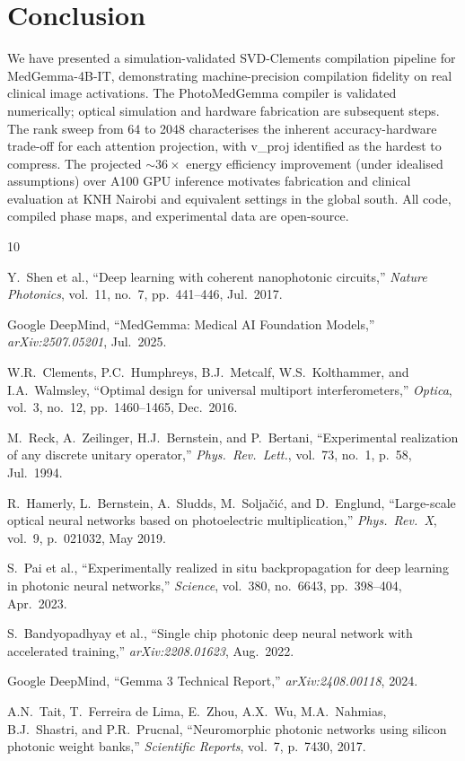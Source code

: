 \documentclass[journal]{IEEEtran}
\begin{document}
\section{Conclusion}
\label{sec:conclusion}

We have presented a simulation-validated SVD-Clements compilation pipeline
for MedGemma-4B-IT, demonstrating machine-precision compilation fidelity
on real clinical image activations.
The PhotoMedGemma compiler is validated numerically; optical simulation and
hardware fabrication are subsequent steps.
The rank sweep from 64 to 2048 characterises the inherent accuracy-hardware
trade-off for each attention projection, with v\_proj identified as the
hardest to compress.
The projected $\sim36\times$ energy efficiency improvement (under idealised
assumptions) over A100 GPU inference motivates fabrication and clinical
evaluation at KNH Nairobi and equivalent settings in the global south.
All code, compiled phase maps, and experimental data are open-source.


\begin{thebibliography}{10}

Y.\ Shen et al., ``Deep learning with coherent nanophotonic circuits,''
\textit{Nature Photonics}, vol.\ 11, no.\ 7, pp.\ 441--446, Jul.\ 2017.

Google DeepMind, ``MedGemma: Medical AI Foundation Models,''
\textit{arXiv:2507.05201}, Jul.\ 2025.

W.R.\ Clements, P.C.\ Humphreys, B.J.\ Metcalf, W.S.\ Kolthammer, and
I.A.\ Walmsley, ``Optimal design for universal multiport interferometers,''
\textit{Optica}, vol.\ 3, no.\ 12, pp.\ 1460--1465, Dec.\ 2016.

M.\ Reck, A.\ Zeilinger, H.J.\ Bernstein, and P.\ Bertani,
``Experimental realization of any discrete unitary operator,''
\textit{Phys.\ Rev.\ Lett.}, vol.\ 73, no.\ 1, p.\ 58, Jul.\ 1994.

R.\ Hamerly, L.\ Bernstein, A.\ Sludds, M.\ Solja\v{c}i\'{c}, and D.\ Englund,
``Large-scale optical neural networks based on photoelectric multiplication,''
\textit{Phys.\ Rev.\ X}, vol.\ 9, p.\ 021032, May 2019.

S.\ Pai et al., ``Experimentally realized in situ backpropagation for deep
learning in photonic neural networks,'' \textit{Science}, vol.\ 380, no.\ 6643,
pp.\ 398--404, Apr.\ 2023.

S.\ Bandyopadhyay et al., ``Single chip photonic deep neural network with
accelerated training,'' \textit{arXiv:2208.01623}, Aug.\ 2022.

Google DeepMind, ``Gemma 3 Technical Report,'' \textit{arXiv:2408.00118}, 2024.

A.N.\ Tait, T.\ Ferreira de Lima, E.\ Zhou, A.X.\ Wu, M.A.\ Nahmias,
B.J.\ Shastri, and P.R.\ Prucnal,
``Neuromorphic photonic networks using silicon photonic weight banks,''
\textit{Scientific Reports}, vol.\ 7, p.\ 7430, 2017.

\end{thebibliography}
\end{document}

